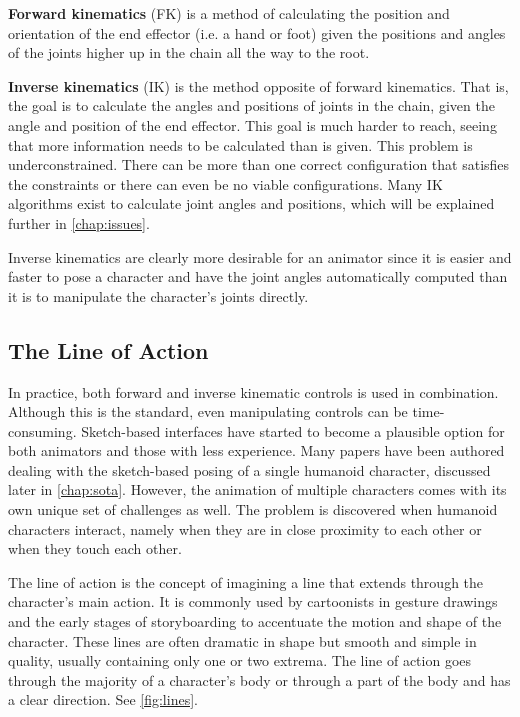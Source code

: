 \textbf{Forward kinematics} (FK) is a method of calculating the position and orientation of the end effector (i.e. a hand or foot) given the positions and angles of the joints higher up in the chain all the way to the root. 

\textbf{Inverse kinematics} (IK) is the method opposite of forward kinematics. That is, the goal is to calculate the angles and positions of joints in the chain, given the angle and position of the end effector. This goal is much harder to reach, seeing that more information needs to be calculated than is given. This problem is underconstrained. There can be more than one correct configuration that satisfies the constraints or there can even be no viable configurations. Many IK algorithms exist to calculate joint angles and positions, which will be explained further in \autoref{chap:issues}.

Inverse kinematics are clearly more desirable for an animator since it is easier and faster to pose a character and have the joint angles automatically computed than it is to manipulate the character's joints directly.

\subsection{The Line of Action}
In practice, both forward and inverse kinematic controls is used in combination. Although this is the standard, even manipulating controls can be time-consuming. Sketch-based interfaces have started to become a plausible option for both animators and those with less experience. Many papers have been authored dealing with the sketch-based posing of a single humanoid character, discussed later in \autoref{chap:sota}. However, the animation of multiple characters comes with its own unique set of challenges as well. The problem is discovered when humanoid characters interact, namely when they are in close proximity to each other or when they touch each other.

The line of action is the concept of imagining a line that extends through the character's main action. It is commonly used by cartoonists in gesture drawings and the early stages of storyboarding to accentuate the motion and shape of the character. These lines are often dramatic in shape but smooth and simple in quality, usually containing only one or two extrema. The line of action goes through the majority of a character's body or through a part of the body and has a clear direction. See \autoref{fig:lines}.

